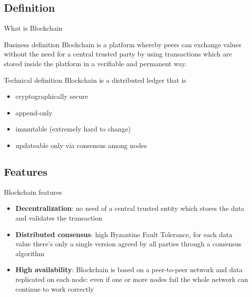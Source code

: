 \documentclass{beamer}
\begin{document}
  \subsection{Definition}
  \begin{frame}{What is Blockchain}
    \begin{block}{Business definition}
      Blockchain is a platform whereby peers can exchange values without the need
      for a central trusted party by using transactions which are stored inside
      the platform in a verifiable and permanent way.
    \end{block}
    
    \pause
    \begin{block}{Technical definition}
      Blockchain is a distributed ledger that is
      \begin{itemize}
        \item cryptographically secure
        \item append-only
        \item immutable (extremely hard to change)
        \item updateable only via consensus among nodes
      \end{itemize}
    \end{block}
  \end{frame}



  \subsection{Features}
  \begin{frame}{Blockchain features}
    \begin{itemize}
      \item \textbf{Decentralization}: no need of a central trusted entity
      which stores the data and validates the transaction \pause
      \item \textbf{Distributed consensus}: high Byzantine Fault
      Tolerance, for each data value there's only a single version agreed by all
      parties through a consensus algorithm \pause
      \item \textbf{High availability}: Blockchain is based on a peer-to-peer
      network and data replicated on each node: even if one or more nodes fail
      the whole network can continue to work correctly
    \end{itemize}
  \end{frame}
\end{document}
